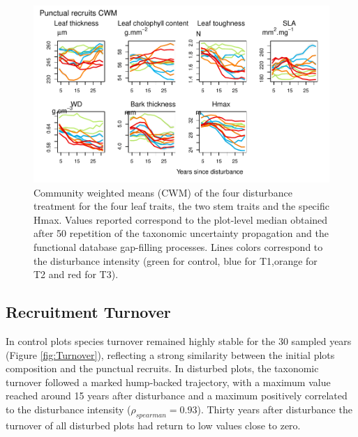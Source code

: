 \documentclass[fleqn,10pt]{ArtEcoFoG} %
\begin{document}
\begin{figure}

{\centering \includegraphics[width=0.8\linewidth]{RecruitmentTrajectories_files/figure-latex/CWM-1} 

}

\caption{Community weighted means (CWM) of the four disturbance treatment for the four leaf traits, the two stem traits  and the specific Hmax. Values reported correspond to the plot-level median obtained after 50 repetition of the taxonomic uncertainty propagation and the functional database gap-filling processes. Lines colors correspond to the disturbance intensity (green for control, blue for T1,orange for T2 and red for T3).}\label{fig:CWM}
\end{figure}

\subsection{Recruitment Turnover}\label{recruitment-turnover}

In control plots species turnover remained highly stable for the 30
sampled years (Figure \ref{fig:Turnover}), reflecting a strong
similarity between the initial plots composition and the punctual
recruits. In disturbed plots, the taxonomic turnover followed a marked
hump-backed trajectory, with a maximum value reached around 15 years
after disturbance and a maximum positively correlated to the disturbance
intensity (\(\rho_{spearman}=0.93\)). Thirty years after disturbance the
turnover of all disturbed plots had return to low values close to zero.
\end{document}
